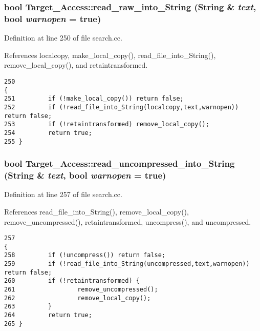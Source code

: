 \subsubsection{\setlength{\rightskip}{0pt plus 5cm}bool Target\_\-Access::read\_\-raw\_\-into\_\-String ({\bf String} \& {\em text}, bool {\em warnopen} = {\bf true})}\label{classTarget__Access_a9}




Definition at line 250 of file search.cc.

References localcopy, make\_\-local\_\-copy(), read\_\-file\_\-into\_\-String(), remove\_\-local\_\-copy(), and retaintransformed.



\footnotesize\begin{verbatim}250                                                                             {
251         if (!make_local_copy()) return false;
252         if (!read_file_into_String(localcopy,text,warnopen)) return false;
253         if (!retaintransformed) remove_local_copy();
254         return true;
255 }
\end{verbatim}\normalsize 
{}
\subsubsection{\setlength{\rightskip}{0pt plus 5cm}bool Target\_\-Access::read\_\-uncompressed\_\-into\_\-String ({\bf String} \& {\em text}, bool {\em warnopen} = {\bf true})}\label{classTarget__Access_a10}




Definition at line 257 of file search.cc.

References read\_\-file\_\-into\_\-String(), remove\_\-local\_\-copy(), remove\_\-uncompressed(), retaintransformed, uncompress(), and uncompressed.



\footnotesize\begin{verbatim}257                                                                                      {
258         if (!uncompress()) return false;
259         if (!read_file_into_String(uncompressed,text,warnopen)) return false;
260         if (!retaintransformed) {
261                 remove_uncompressed();
262                 remove_local_copy();
263         }
264         return true;
265 }
\end{verbatim}\normalsize 
{}
